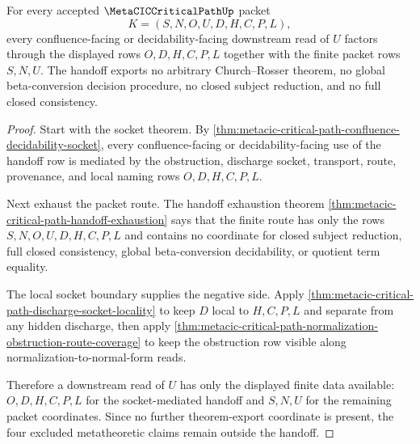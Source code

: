 \begin{theorem}
\label{thm:metacic-critical-path-confluence-decidability-handoff-exhaustion}
For every accepted $\MetaCICCriticalPathUp$ packet
$$
K=(S,N,O,U,D,H,C,P,L),
$$
every confluence-facing or decidability-facing downstream read of $U$ factors through the displayed rows $O,D,H,C,P,L$ together with the finite packet rows $S,N,U$. The handoff exports no arbitrary Church--Rosser theorem, no global beta-conversion decision procedure, no closed subject reduction, and no full closed consistency.
\end{theorem}
\begin{proof}
Start with the socket theorem. By \autoref{thm:metacic-critical-path-confluence-decidability-socket}, every confluence-facing or decidability-facing use of the handoff row is mediated by the obstruction, discharge socket, transport, route, provenance, and local naming rows $O,D,H,C,P,L$.

Next exhaust the packet route. The handoff exhaustion theorem \autoref{thm:metacic-critical-path-handoff-exhaustion} says that the finite route has only the rows $S,N,O,U,D,H,C,P,L$ and contains no coordinate for closed subject reduction, full closed consistency, global beta-conversion decidability, or quotient term equality.

The local socket boundary supplies the negative side. Apply \autoref{thm:metacic-critical-path-discharge-socket-locality} to keep $D$ local to $H,C,P,L$ and separate from any hidden discharge, then apply \autoref{thm:metacic-critical-path-normalization-obstruction-route-coverage} to keep the obstruction row visible along normalization-to-normal-form reads.

Therefore a downstream read of $U$ has only the displayed finite data available: $O,D,H,C,P,L$ for the socket-mediated handoff and $S,N,U$ for the remaining packet coordinates. Since no further theorem-export coordinate is present, the four excluded metatheoretic claims remain outside the handoff.
\end{proof}

